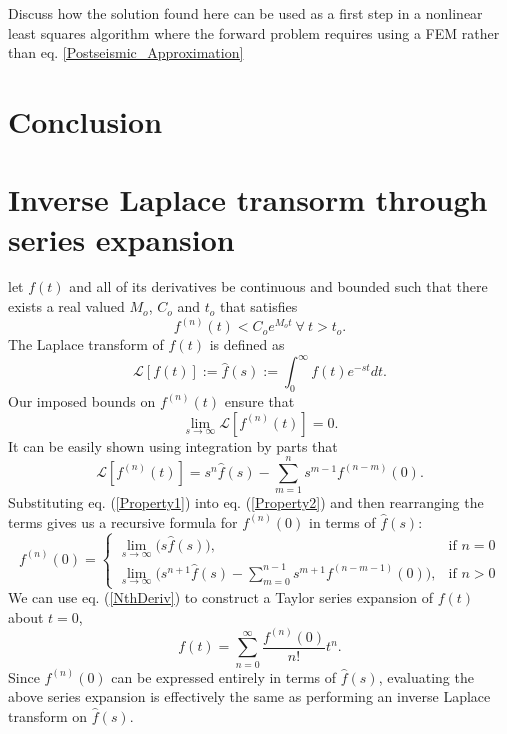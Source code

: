 \documentclass[fleqn,12pt]{article}
\begin{document}
Discuss how the solution found here can be used as a first step in a
nonlinear least squares algorithm where the forward problem requires
using a FEM rather than eq. \ref{Postseismic_Approximation}
\section{Conclusion}

\appendix
\section{Inverse Laplace transorm through series expansion}

let $f(t)$ and all of its derivatives be continuous and bounded such 
that there exists a real valued $M_o$, $C_o$ and $t_o$ that satisfies
\begin{equation}
  f^{(n)}(t) < C_oe^{M_ot}\ \forall\ t > t_o.
\end{equation}
The Laplace transform of $f(t)$ is defined as
\begin{equation}
  \mathcal{L}[f(t)] := \hat{f}(s) := \int_{0}^\infty f(t)e^{-st}dt.
\end{equation}
Our imposed bounds on $f^{(n)}(t)$ ensure that
\begin{equation}\label{Property2}
  \lim_{s \to \infty}\mathcal{L}[f^{(n)}(t)] = 0.
\end{equation}
It can be easily shown using integration by parts that
\begin{equation}\label{Property1}
  \mathcal{L}[f^{(n)}(t)] = s^n\hat{f}(s) - \sum_{m=1}^ns^{m-1}f^{(n-m)}(0).
\end{equation}
Substituting eq. (\ref{Property1}) into eq. (\ref{Property2}) and then
rearranging the terms gives us a recursive formula for $f^{(n)}(0)$ in
terms of $\hat{f}(s)$:
\begin{equation}\label{NthDeriv}
  f^{(n)}(0) = 
  \begin{cases}
    \lim_{s \to \infty} \big( s\hat{f}(s)\big),& \text{if } n=0\\
    \lim_{s \to \infty} \big( s^{n + 1}\hat{f}(s) - 
                     \sum_{m=0}^{n-1} s^{m+1}f^{(n-m-1)}(0)\big),& \text{if } n > 0
  \end{cases}
\end{equation}
We can use eq. (\ref{NthDeriv}) to construct a Taylor series
expansion of $f(t)$ about $t=0$,
\begin{equation}
  f(t) = \sum_{n=0}^\infty\frac{f^{(n)}(0)}{n!}t^n.
\end{equation}
Since $f^{(n)}(0)$ can be expressed entirely in terms of
$\hat f(s)$, evaluating the above series expansion is effectively the
same as performing an inverse Laplace transform on $\hat f(s)$.
\end{document}
